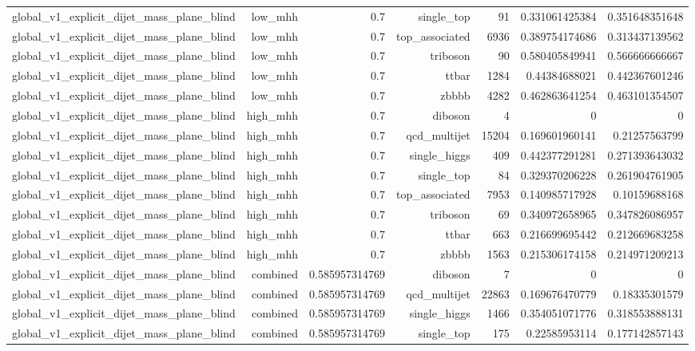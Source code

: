 \begin{table}[htbp]
{\begin{tabular}{lrrrrrr}
global\_v1\_explicit\_dijet\_mass\_plane\_blind & low\_mhh & 0.7 & single\_top & 91 & 0.331061425384 & 0.351648351648 \\
global\_v1\_explicit\_dijet\_mass\_plane\_blind & low\_mhh & 0.7 & top\_associated & 6936 & 0.389754174686 & 0.313437139562 \\
global\_v1\_explicit\_dijet\_mass\_plane\_blind & low\_mhh & 0.7 & triboson & 90 & 0.580405849941 & 0.566666666667 \\
global\_v1\_explicit\_dijet\_mass\_plane\_blind & low\_mhh & 0.7 & ttbar & 1284 & 0.44384688021 & 0.442367601246 \\
global\_v1\_explicit\_dijet\_mass\_plane\_blind & low\_mhh & 0.7 & zbbbb & 4282 & 0.462863641254 & 0.463101354507 \\
global\_v1\_explicit\_dijet\_mass\_plane\_blind & high\_mhh & 0.7 & diboson & 4 & 0 & 0 \\
global\_v1\_explicit\_dijet\_mass\_plane\_blind & high\_mhh & 0.7 & qcd\_multijet & 15204 & 0.169601960141 & 0.21257563799 \\
global\_v1\_explicit\_dijet\_mass\_plane\_blind & high\_mhh & 0.7 & single\_higgs & 409 & 0.442377291281 & 0.271393643032 \\
global\_v1\_explicit\_dijet\_mass\_plane\_blind & high\_mhh & 0.7 & single\_top & 84 & 0.329370206228 & 0.261904761905 \\
global\_v1\_explicit\_dijet\_mass\_plane\_blind & high\_mhh & 0.7 & top\_associated & 7953 & 0.140985717928 & 0.10159688168 \\
global\_v1\_explicit\_dijet\_mass\_plane\_blind & high\_mhh & 0.7 & triboson & 69 & 0.340972658965 & 0.347826086957 \\
global\_v1\_explicit\_dijet\_mass\_plane\_blind & high\_mhh & 0.7 & ttbar & 663 & 0.216699695442 & 0.212669683258 \\
global\_v1\_explicit\_dijet\_mass\_plane\_blind & high\_mhh & 0.7 & zbbbb & 1563 & 0.215306174158 & 0.214971209213 \\
global\_v1\_explicit\_dijet\_mass\_plane\_blind & combined & 0.585957314769 & diboson & 7 & 0 & 0 \\
global\_v1\_explicit\_dijet\_mass\_plane\_blind & combined & 0.585957314769 & qcd\_multijet & 22863 & 0.169676470779 & 0.18335301579 \\
global\_v1\_explicit\_dijet\_mass\_plane\_blind & combined & 0.585957314769 & single\_higgs & 1466 & 0.354051071776 & 0.318553888131 \\
global\_v1\_explicit\_dijet\_mass\_plane\_blind & combined & 0.585957314769 & single\_top & 175 & 0.22585953114 & 0.177142857143 \\

\end{tabular}}
\end{table}
